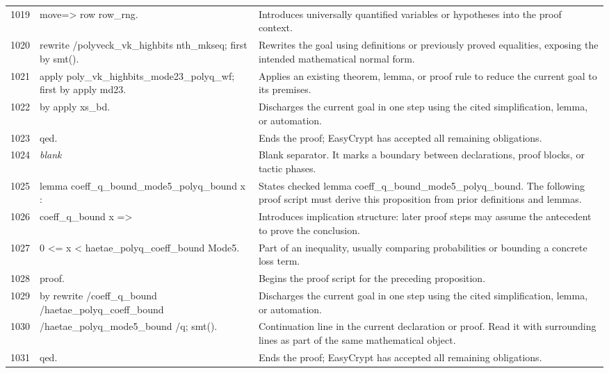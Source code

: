 \documentclass[10pt]{article}
\begin{document}
\begin{longtable}{r L{0.53\textwidth} L{0.37\textwidth}}
1019 & {\ttfamily\scriptsize move=> row row\_rng.} & Introduces universally quantified variables or hypotheses into the proof context. \\
1020 & {\ttfamily\scriptsize rewrite /polyveck\_vk\_highbits nth\_mkseq; first by smt().} & Rewrites the goal using definitions or previously proved equalities, exposing the intended mathematical normal form. \\
1021 & {\ttfamily\scriptsize apply poly\_vk\_highbits\_mode23\_polyq\_wf; first by apply md23.} & Applies an existing theorem, lemma, or proof rule to reduce the current goal to its premises. \\
1022 & {\ttfamily\scriptsize by apply xs\_bd.} & Discharges the current goal in one step using the cited simplification, lemma, or automation. \\
1023 & {\ttfamily\scriptsize qed.} & Ends the proof; EasyCrypt has accepted all remaining obligations. \\
1024 & {\ttfamily\scriptsize \emph{blank}} & Blank separator.  It marks a boundary between declarations, proof blocks, or tactic phases. \\
1025 & {\ttfamily\scriptsize lemma coeff\_q\_bound\_mode5\_polyq\_bound x :} & States checked lemma coeff\_q\_bound\_mode5\_polyq\_bound.  The following proof script must derive this proposition from prior definitions and lemmas. \\
1026 & {\ttfamily\scriptsize   coeff\_q\_bound x =>} & Introduces implication structure: later proof steps may assume the antecedent to prove the conclusion. \\
1027 & {\ttfamily\scriptsize   0 <= x < haetae\_polyq\_coeff\_bound Mode5.} & Part of an inequality, usually comparing probabilities or bounding a concrete loss term. \\
1028 & {\ttfamily\scriptsize proof.} & Begins the proof script for the preceding proposition. \\
1029 & {\ttfamily\scriptsize by rewrite /coeff\_q\_bound /haetae\_polyq\_coeff\_bound} & Discharges the current goal in one step using the cited simplification, lemma, or automation. \\
1030 & {\ttfamily\scriptsize            /haetae\_polyq\_mode5\_bound /q; smt().} & Continuation line in the current declaration or proof.  Read it with surrounding lines as part of the same mathematical object. \\
1031 & {\ttfamily\scriptsize qed.} & Ends the proof; EasyCrypt has accepted all remaining obligations. \\

\end{longtable}
\end{document}
